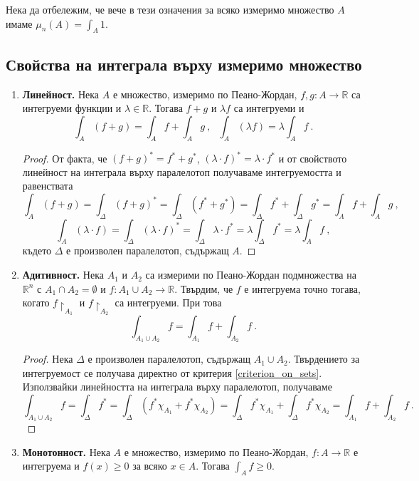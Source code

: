 \documentclass[11pt]{article}
\numberwithin{equation}{section}
\numberwithin{figure}{section}
\numberwithin{table}{section}
\theoremstyle{plain}
\theoremstyle{definition}
\theoremstyle{remark}
\theoremstyle{definition}
\theoremstyle{remark}
\theoremstyle{plain}
\theoremstyle{definition}
\theoremstyle{definition}
\theoremstyle{plain}
\theoremstyle{plain}
\theoremstyle{plain}
\theoremstyle{definition}
\theoremstyle{plain}
\newcommand*{\R}{\mathbb{R}}
\begin{document}
Нека да отбележим, че вече в тези означения за всяко измеримо множество $A$ имаме $\mu_n(A)=\int_A 1$.

\subsection{Свойства на интеграла върху измеримо множество}

\begin{enumerate}
\item \textbf{Линейност.} Нека $A$ е множество, измеримо по Пеано-Жордан, $f, g: A \longrightarrow\R$ са интегруеми функции и $\lambda\in \R$. Тогава
$f+g$ и $\lambda f$ са интегруеми и
$$\int_A (f+g) = \int_A f + \int_A g  \ , \ \ \ \int_A (\lambda f)=\lambda\int_A f \ .$$

\begin{proof}
От факта, че $\left( f+g\right)^* =f^* +g^*$, $\left(\lambda \cdot f\right)^*=\lambda\cdot f^*$ и от свойството линейност на интеграла върху паралелотоп получаваме интегруемостта и равенствата
$$\int_A(f+g)=\int_\Delta\left( f+g\right)^* =\int_\Delta \left( f^* +g^*\right) =\int_\Delta f^* +\int_\Delta g^* = \int_A f+\int_A g \ ,$$
$$\int_A(\lambda \cdot f)=\int_\Delta\left(\lambda \cdot f\right)^* =\int_\Delta \lambda \cdot f^* =\lambda \int_\Delta f^* = \lambda\int_A f \ ,$$
където $\Delta$ е произволен паралелотоп, съдържащ $A$.
\end{proof}

\item \textbf{Адитивност.} Нека $A_1$ и $A_2$ са измерими по Пеано-Жордан подмножества на $\R^n$ с $A_1\cap A_2=\emptyset$ и $f:A_1\cup A_2 \longrightarrow\R$. Твърдим, че $f$ е интегруема точно тогава, когато $f\restriction_{A_1}$ и $f\restriction_{A_2}$ са интегруеми. При това
$$\int_{A_1\cup A_2} f = \int_{A_1} f + \int_{A_2} f \ .$$

\begin{proof}
Нека $\Delta$ е произволен паралелотоп, съдържащ $A_1\cup A_2$. Твърдението за интегруемост се получава директно от критерия \ref{criterion_on_sets}. Използвайки линейността на интеграла върху паралелотоп, получаваме 
$$\int_{A_1\cup A_2} f = \int_\Delta f^* =\int_\Delta\left( f^*\chi_{A_1}+f^*\chi_{A_2}\right) =\int_\Delta f^*\chi_{A_1} +\int_\Delta f^*\chi_{A_2}= \int_{A_1} f+\int_{A_2} f \ .$$
\end{proof}

\item \textbf{Монотонност.} Нека $A$ е множество, измеримо по Пеано-Жордан, $f:A\longrightarrow\R$ е интегруема и $f(x)\ge 0$ за всяко $x\in A$. Тогава $\int_A f \ge 0$.


\end{enumerate}
\end{document}
